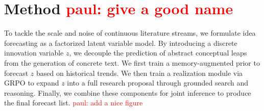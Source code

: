 \documentclass{article} %
\newcommand{\paul}[1]{\textcolor{red}{paul: #1}}
\begin{document}




\section{Method \paul{give a good name}}
To tackle the scale and noise of continuous literature streams, we formulate idea forecasting as a factorized latent variable model. By introducing a discrete innovation variable $z$, we decouple the prediction of abstract conceptual leaps from the generation of concrete text. We first train a memory-augmented prior to forecast $z$ based on historical trends. We then train a realization module via GRPO to expand $z$ into a full research proposal through grounded search and reasoning. Finally, we combine these components for joint inference to produce the final forecast list. \paul{add a nice figure}

\end{document}
